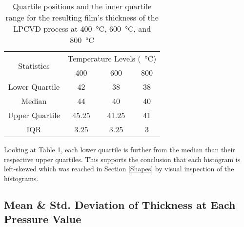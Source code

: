 \documentclass[letterpaper]{article}
\begin{document}
\begin{table}[H]
 \centering
 \begin{tabular}{c|c|c|c|}
  \multirow{2}{*}{Statistics} & \multicolumn{3}{c|}{Temperature Levels (\SI{}{\celsius})}               \\ \cline{2-4}
                              & 400                                                       & 600   & 800 \\ \hline
  Lower Quartile              & 42                                                        & 38    & 38  \\ \hline
  Median                      & 44                                                        & 40    & 40  \\ \hline
  Upper Quartile              & 45.25                                                     & 41.25 & 41  \\ \hline
  IQR                         & 3.25                                                      & 3.25  & 3   \\ \hline
 \end{tabular}
 \caption{Quartile positions and the inner quartile range for the resulting film's thickness of the LPCVD process at \SI{400}{\celsius}, \SI{600}{\celsius}, and \SI{800}{\celsius}}
 \label{tempquart}
\end{table}

Looking at Table \ref{tempquart}, each lower quartile is further from the median than their respective
upper quartiles. This supports the conclusion that each histogram is left-skewed
which was reached in Section \ref{Shapes} by visual inspection of the histograms.
\subsection{Mean \& Std. Deviation of Thickness at Each Pressure Value}
\end{document}

